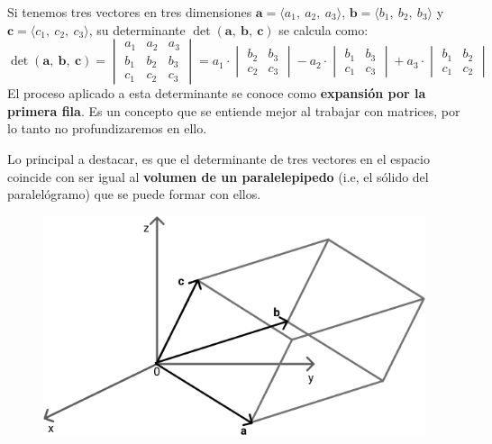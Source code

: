 \documentclass[12pt]{article}
\begin{document}
Si tenemos tres vectores en tres dimensiones $\mathbf{a} = \langle a_{1}, \ a_{2}, \ a_{3} \rangle$, $\mathbf{b} = \langle b_{1}, \ b_{2}, \ b_{3} \rangle$ y $\mathbf{c} = \langle c_{1}, \ c_{2}, \ c_{3} \rangle$, su determinante $\det(\mathbf{a}, \ \mathbf{b}, \ \mathbf{c})$ se calcula como:
\[
\det(\mathbf{a}, \ \mathbf{b}, \ \mathbf{c}) =
\begin{vmatrix}
a_{1} & a_{2} & a_{3} \\
b_{1} & b_{2} & b_{3} \\
c_{1} & c_{2} & c_{3} 
\end{vmatrix} =
a_{1}
\cdot
\begin{vmatrix}
b_{2} & b_{3} \\
c_{2} & c_{3}
\end{vmatrix}
-
a_{2}
\cdot
\begin{vmatrix}
b_{1} & b_{3} \\
c_{1} & c_{3}
\end{vmatrix}
+
a_{3}
\cdot
\begin{vmatrix}
b_{1} & b_{2} \\
c_{1} & c_{2}
\end{vmatrix}
\]
El proceso aplicado a esta determinante se conoce como \textbf{expansión por la primera fila}. Es un concepto que se entiende mejor al trabajar con matrices, por lo tanto no profundizaremos en ello.

Lo principal a destacar, es que el determinante de tres vectores en el espacio coincide con ser igual al \textbf{volumen de un paralelepipedo} (i.e, el sólido del paralelógramo) que se puede formar con ellos.

\begin{figure}[hbt!]
\centering
\includegraphics[scale=0.4]{img/det-vol-parallelel-1.jpg}
\end{figure}
\end{document}
